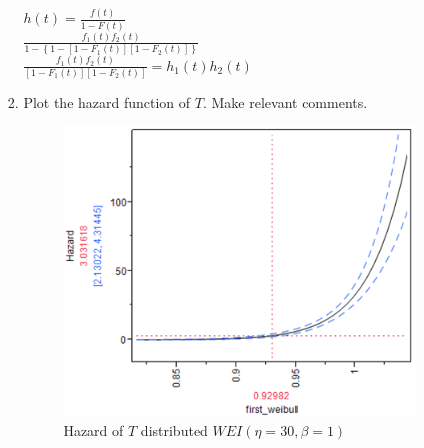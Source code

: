 \documentclass{article}
\begin{document}
\begin{enumerate}
\begin{enumerate}
\begin{enumerate}
  \begin{center}
    \large\(h(t) = \frac{f(t)}{1 - F(t)}\)\\
      \vspace{1cm}
    \(\frac{f_1(t)f_2(t)}{1-\left\{1 - [1 - F_1(t)][1 - F_2(t)]\right\}} \)\\
      \vspace{1cm}
    \(\frac{f_1(t)f_2(t)}{[1 - F_1(t)][1 - F_2(t)]} = h_1(t)h_2(t) \)\\
  \end{center}

\vspace{3in}
  \item Plot the hazard function of \(T \). Make relevant comments.\\

  \begin{center}
        \FloatBarrier
      \begin{figure}
        \centering
        \includegraphics[width = 5in]{prob4d_weibull_1_haz.png}
        \caption{Hazard of \(T \) distributed \( WEI(\eta = 30 , \beta = 1)\)}
      \end{figure}
      \FloatBarrier
  \end{center}
  

\end{enumerate}
\end{enumerate}
\end{enumerate}
\end{document}
